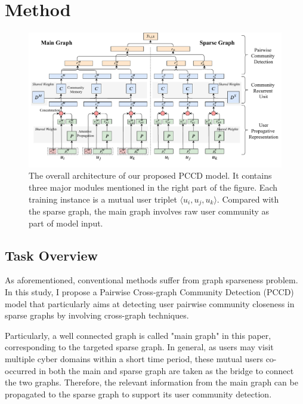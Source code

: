 \section{Method}
\begin{figure}  
	\centering
	\includegraphics[width=1\columnwidth]{img/chapter4/pipeline.pdf}
	\caption{The overall architecture of our proposed PCCD model. It contains three major modules mentioned in the right part of the figure. Each training instance is a mutual user triplet $\langle u_i,u_j,u_k \rangle$. Compared with the sparse graph, the main graph involves raw user community as part of model input.}
	
	\label{fig:c4_pipeline}
\end{figure}
\subsection{Task Overview} \label{sc:to}


As aforementioned, conventional methods suffer from graph sparseness problem. In this study, I propose a Pairwise Cross-graph Community Detection (PCCD) model that particularly aims at detecting user pairwise community closeness in sparse graphs by involving cross-graph techniques. 

Particularly, a well connected graph is called "main graph" in this paper, corresponding to the targeted sparse graph. In general, as users may visit multiple cyber domains within a short time period, these mutual users co-occurred in both the main and sparse graph are taken as the bridge to connect the two graphs. Therefore, the relevant information from the main graph can be propagated to the sparse graph to support its user community detection. 

